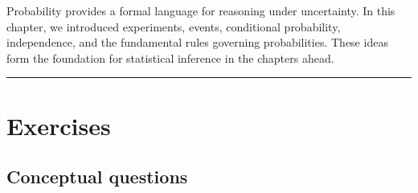 \documentclass[
  letterpaper,
  DIV=11,
  numbers=noendperiod]{scrreprt}
\begin{document}
\begin{tcolorbox}[enhanced jigsaw, coltitle=black, colbacktitle=quarto-callout-important-color!10!white, left=2mm, bottomrule=.15mm, bottomtitle=1mm, colback=white, titlerule=0mm, colframe=quarto-callout-important-color-frame, breakable, leftrule=.75mm, toptitle=1mm, opacitybacktitle=0.6, rightrule=.15mm, title=\textcolor{quarto-callout-important-color}{\faExclamation}\hspace{0.5em}{Chapter summary}, arc=.35mm, opacityback=0, toprule=.15mm]

Probability provides a formal language for reasoning under uncertainty.
In this chapter, we introduced experiments, events, conditional
probability, independence, and the fundamental rules governing
probabilities. These ideas form the foundation for statistical inference
in the chapters ahead.

\end{tcolorbox}

\begin{center}\rule{0.5\linewidth}{0.5pt}\end{center}

\section{Exercises}\label{exercises-3}

\subsection{Conceptual questions}\label{conceptual-questions-3}
\end{document}
